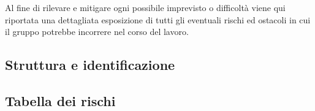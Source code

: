 Al fine di rilevare e mitigare ogni possibile imprevisto o difficoltà viene qui riportata una dettagliata esposizione di tutti gli eventuali rischi ed ostacoli in cui il gruppo \Gruppo{} potrebbe incorrere nel corso del lavoro.

\subsection{Struttura e identificazione}\label{sec:StrutturaRischi}


\subsection{Tabella dei rischi}\label{sec:TabellaRischi}
